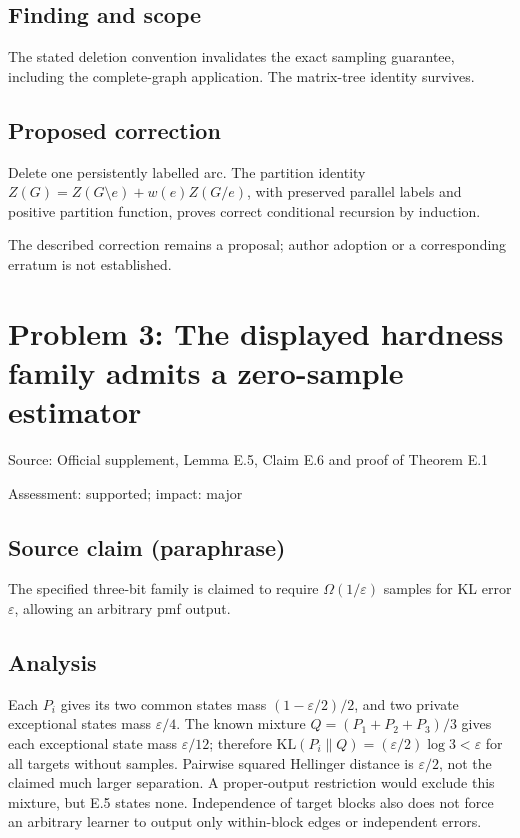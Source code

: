 \documentclass[11pt]{article}
\begin{document}
\subsection*{Finding and scope}

The stated deletion convention invalidates the exact sampling guarantee, including the complete-graph application. The matrix-tree identity survives.

\subsection*{Proposed correction}

Delete one persistently labelled arc. The partition identity \(Z(G)=Z(G\setminus e)+w(e)Z(G/e)\), with preserved parallel labels and positive partition function, proves correct conditional recursion by induction.

The described correction remains a proposal; author adoption or a corresponding erratum is not established.

\section*{Problem 3: The displayed hardness family admits a zero-sample estimator}

Source: Official supplement, Lemma E.5, Claim E.6 and proof of Theorem E.1

Assessment: supported; impact: major

\subsection*{Source claim (paraphrase)}

The specified three-bit family is claimed to require \(\Omega(1/\varepsilon)\) samples for KL error \(\varepsilon\), allowing an arbitrary pmf output.

\subsection*{Analysis}

Each \(P_i\) gives its two common states mass \((1-\varepsilon/2)/2\), and two private exceptional states mass \(\varepsilon/4\). The known mixture \(Q=(P_1+P_2+P_3)/3\) gives each exceptional state mass \(\varepsilon/12\); therefore \(\mathrm{KL}(P_i\|Q)=(\varepsilon/2)\log3<\varepsilon\) for all targets without samples. Pairwise squared Hellinger distance is \(\varepsilon/2\), not the claimed much larger separation. A proper-output restriction would exclude this mixture, but E.5 states none. Independence of target blocks also does not force an arbitrary learner to output only within-block edges or independent errors.
\end{document}
